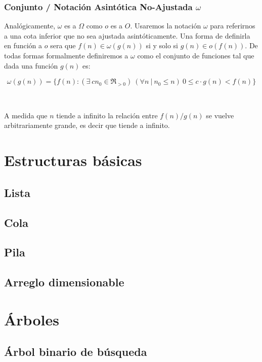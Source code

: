\documentclass[10pt, a4paper]{report}
\begin{document}
\subsubsection{Conjunto / Notaci\'on Asint\'otica No-Ajustada $\omega$}

Anal\'ogicamente, $\omega$ es a $\Omega$ como $o$ es a $O$. Usaremos la notaci\'on $\omega$ para referirnos a una cota inferior que no sea ajustada asint\'oticamente. Una forma de definirla en funci\'on a $o$ sera que $f(n) \in \omega(g(n))$ si y solo si $g(n) \in o(f(n))$. De todas formas formalmente definiremos a $\omega$ como el conjunto de funciones tal que dada una funci\'on $g(n)$ es:

\begin{equation*}
 \omega(g(n)) = \{ f(n) : (\exists\ c n_0 \in \Re_{>0}) \ (\forall n\ |\ n_0 \leq n)\ 0 \leq c \cdot g(n) < f(n) \}
\end{equation*}

~

A medida que $n$ tiende a infinito la relaci\'on entre $f(n)/g(n)$ se vuelve arbitrariamente grande, es decir que tiende a infinito.

\newpage
\section{Estructuras b\'asicas}
\subsection{Lista}
\subsection{Cola}
\subsection{Pila}
\subsection{Arreglo dimensionable}

\newpage
\section{\'Arboles}
\subsection{\'Arbol binario de b\'usqueda}
\end{document}
